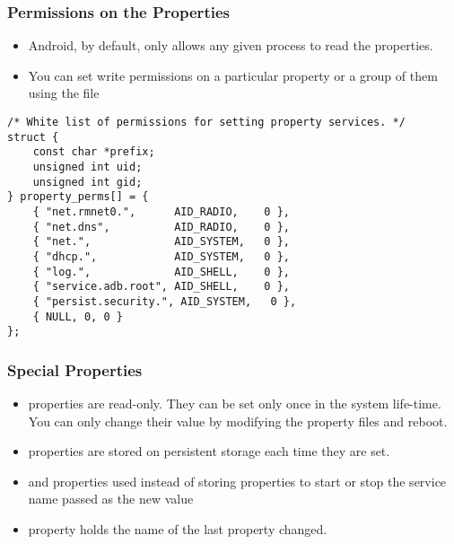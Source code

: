 \begin{frame}[fragile]
  \frametitle{Permissions on the Properties}
  \fontsize{10}{10}\selectfont
  \begin{itemize}
  \item Android, by default, only allows any given process to read the
    properties.
  \item You can set write permissions on a particular property or a
    group of them using the file
  \end{itemize}
\begin{verbatim}
/* White list of permissions for setting property services. */
struct {
    const char *prefix;
    unsigned int uid;
    unsigned int gid;
} property_perms[] = {
    { "net.rmnet0.",      AID_RADIO,    0 },
    { "net.dns",          AID_RADIO,    0 },
    { "net.",             AID_SYSTEM,   0 },
    { "dhcp.",            AID_SYSTEM,   0 },
    { "log.",             AID_SHELL,    0 },
    { "service.adb.root", AID_SHELL,    0 },
    { "persist.security.", AID_SYSTEM,   0 },
    { NULL, 0, 0 }
};
\end{verbatim}
\end{frame}

\begin{frame}
  \frametitle{Special Properties}
  \begin{itemize}
  \item {} properties are read-only. They can be set only
    once in the system life-time. You can only change their value by
    modifying the property files and reboot.
  \item {} properties are stored on persistent storage
    each time they are set.
  \item {} and  properties used instead
    of storing properties to start or stop the service name passed as
    the new value
  \item {} property holds the name of the last
     property changed.
  \end{itemize}
\end{frame}
